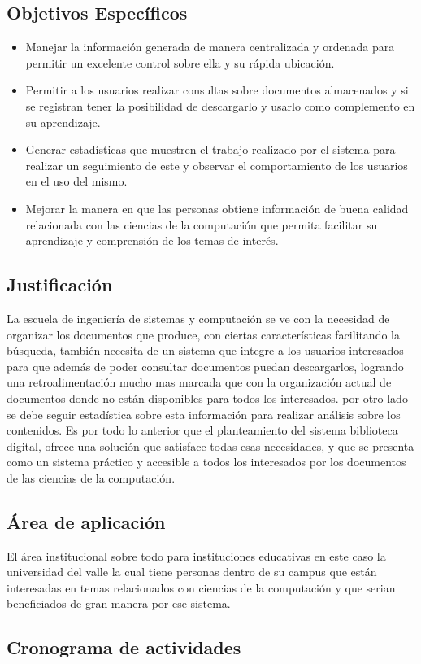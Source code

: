         	\subsection{Objetivos Específicos}
        	\begin{itemize}
        		\item Manejar la información generada de manera centralizada y ordenada para 
        		permitir un excelente control sobre ella y su rápida ubicación.
        		\item Permitir a los usuarios realizar consultas sobre documentos almacenados y si
        		se registran tener la posibilidad de descargarlo y usarlo como complemento en su
        		aprendizaje.
        		\item Generar estadísticas que muestren el trabajo realizado por el sistema para
        		realizar un seguimiento de este y observar el comportamiento de los usuarios en el
        		uso del mismo.
        		\item Mejorar la manera en que las personas obtiene información de buena calidad
        		relacionada con las ciencias de la computación que permita facilitar su aprendizaje
        		y comprensión de los temas de interés.
        	\end{itemize}      
        
        \subsection{Justificación}
        La escuela de ingeniería de sistemas y computación se ve con la necesidad de organizar los
        documentos que produce, con ciertas características facilitando la búsqueda, también
        necesita de un sistema que integre a los usuarios interesados para que además de poder
        consultar documentos puedan descargarlos, logrando una retroalimentación mucho mas marcada
        que con la organización actual de documentos donde no están disponibles para todos los
        interesados. por otro lado se debe seguir estadística sobre esta información para realizar
        análisis sobre los contenidos.
        Es por todo lo anterior que el planteamiento del sistema biblioteca digital, ofrece una
        solución que satisface todas esas necesidades, y que se presenta como un sistema práctico y
        accesible a todos los interesados por los documentos de las ciencias de la computación.
        
        \subsection{Área de aplicación}
        El área institucional sobre todo para instituciones educativas en este caso la universidad
        del valle la cual tiene personas dentro de su campus que están interesadas en temas 
        relacionados con ciencias de la computación y que serian beneficiados de gran manera por
        ese sistema.
        
        \subsection{Cronograma de actividades}
			
